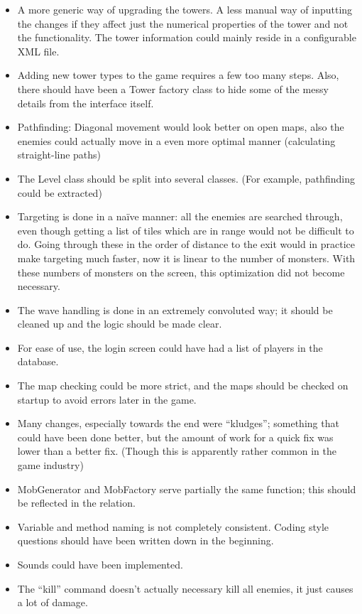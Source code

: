 \documentclass[11pt]{article}
\begin{document}
\begin{itemize}
\item A more generic way of upgrading the towers. A less manual way of
  inputting the changes if they affect just the numerical properties
  of the tower and not the functionality. The tower information could
  mainly reside in a configurable XML file.
\item Adding new tower types to the game requires a few too many
    steps. Also, there should have been a Tower factory class to hide
    some of the messy details from the interface itself.
\item Pathfinding: Diagonal movement would look better on open maps,
    also the enemies could actually move in a even more optimal manner
    (calculating straight-line paths)
\item The Level class should be split into several classes. (For
    example, pathfinding could be extracted)
\item Targeting is done in a naïve manner: all the enemies are searched
    through, even though getting a list of tiles which are in range
    would not be difficult to do. Going through these in the order of
    distance to the exit would in practice make targeting much faster,
    now it is linear to the number of monsters. With these numbers of
    monsters on the screen, this optimization did not become
    necessary.
  \item The wave handling is done in an extremely convoluted way; it
    should be cleaned up and the logic should be made clear.
  \item For ease of use, the login screen could have had a list of
    players in the database.
  \item The map checking could be more strict, and the maps should be
    checked on startup to avoid errors later in the game.
\item Many changes, especially towards the end were ``kludges''; something
    that could have been done better, but the amount of work for a
    quick fix was lower than a better fix. (Though this is apparently
    rather common in the game industry)
  \item MobGenerator and MobFactory serve partially the same function;
    this should be reflected in the relation.
  \item Variable and method naming is not completely
    consistent. Coding style questions should have been written down
    in the beginning.
  \item Sounds could have been implemented.
  \item The ``kill'' command doesn't actually necessary kill all
    enemies, it just causes a lot of damage.
\end{itemize}
\end{document}

